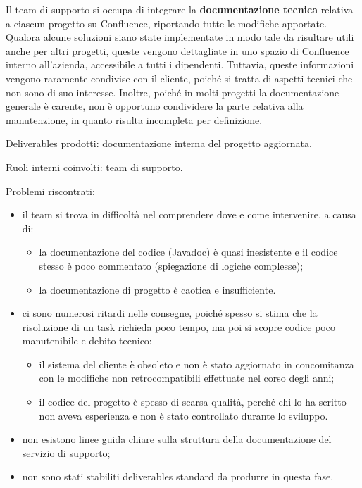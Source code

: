     Il team di supporto si occupa di integrare la \textbf{documentazione tecnica} relativa a ciascun progetto su Confluence, riportando tutte le modifiche apportate.
    Qualora alcune soluzioni siano state implementate in modo tale da risultare utili anche per altri progetti, queste vengono dettagliate in uno spazio di Confluence
    interno all’azienda, accessibile a tutti i dipendenti. Tuttavia, queste informazioni vengono raramente condivise con il cliente, poiché si tratta di aspetti
    tecnici che non sono di suo interesse. Inoltre, poiché in molti progetti la documentazione generale è carente, non è opportuno condividere la parte relativa alla
    manutenzione, in quanto risulta incompleta per definizione.

    Deliverables prodotti: documentazione interna del progetto aggiornata.

    Ruoli interni coinvolti: team di supporto.

    Problemi riscontrati:
    \begin{itemize}
        \item il team si trova in difficoltà nel comprendere dove e come intervenire, a causa di:
            \begin{itemize}
                \item la documentazione del codice (Javadoc) è quasi inesistente e il codice stesso è poco commentato (spiegazione di logiche complesse);
                \item la documentazione di progetto è caotica e insufficiente.
            \end{itemize}
        \item ci sono numerosi ritardi nelle consegne, poiché spesso si stima che la risoluzione di un task richieda poco tempo, ma poi si scopre codice poco manutenibile e debito tecnico:
            \begin{itemize}
                \item il sistema del cliente è obsoleto e non è stato aggiornato in concomitanza con le modifiche non retrocompatibili effettuate nel corso degli anni;
                \item il codice del progetto è spesso di scarsa qualità, perché chi lo ha scritto non aveva esperienza e non è stato controllato durante lo sviluppo.
            \end{itemize}
        \item non esistono linee guida chiare sulla struttura della documentazione del servizio di supporto;
        \item non sono stati stabiliti deliverables standard da produrre in questa fase.
    \end{itemize}

